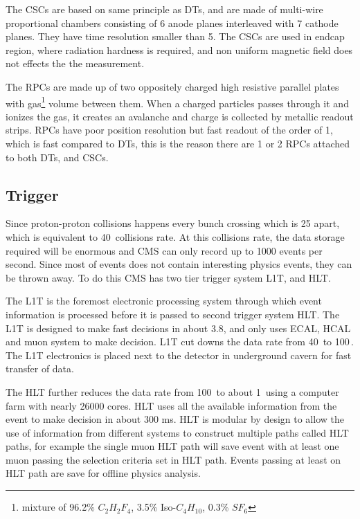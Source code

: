 The \glspl{CSC} are based on same principle as \glspl{DT},
and are made of multi-wire proportional chambers consisting of
6 anode planes interleaved with 7 cathode planes. They have time resolution
smaller than 5\nanoseconds. The \glspl{CSC} are used in endcap region,
where radiation hardness is required, and non uniform magnetic field does not
effects the the measurement.

The \glspl{RPC} are made up of two oppositely charged high resistive parallel
plates with gas\footnote{mixture of 96.2\% \( C_{2}H_{2}F_{4} \), 3.5\% Iso-\( C_{4}H_{10} \),
0.3\% \( S{F}_{6} \)} volume between them.
When a charged particles passes through it and ionizes the gas, it creates
an avalanche and charge is collected by metallic readout strips.
\glspl{RPC} have poor position resolution but fast readout of the order of 1\nanoseconds,
which is fast compared to \glspl{DT}, this is the reason there are 1 or 2 \glspl{RPC}
attached to both \glspl{DT}, and \glspl{CSC}.

\subsection{
  Trigger
}\label{ch_cms:L1T}

Since proton-proton collisions happens every bunch crossing which is
25\nanoseconds{} apart, which is equivalent to 40\,\xspace collisions rate.
At this collisions rate, the data storage required will be enormous
and \gls{CMS} can only record up to 1000 events per second. Since most of events
does not contain interesting physics events, they can be thrown away.
To do this \gls{CMS} has two tier trigger system \gls{L1T}, and \gls{HLT}.

The \gls{L1T} is the foremost electronic processing system through
which event information is processed before it is passed to
second trigger system \gls{HLT}.
The \gls{L1T} is designed to make fast decisions in about 3.8\mus,
and only uses \gls{ECAL}, \gls{HCAL} and muon system to make decision.
\gls{L1T} cut downs the data rate from 40\,\xspace to
100\,\xspace. The \gls{L1T} electronics is placed next to
the detector in underground cavern for fast transfer of data.

The \gls{HLT} further reduces the data rate from 100\,\xspace to
about 1\,\xspace using a computer farm with nearly 26000 cores.
\gls{HLT} uses all the available information from the event to make
decision in about 300 ms. \gls{HLT} is modular by design
to allow the use of information from different systems to construct
multiple paths called \gls{HLT} paths, for example the single muon \gls{HLT}
path will save event with at least one muon passing the selection criteria
set in \gls{HLT} path. Events passing at least on \gls{HLT} path are
save for offline physics analysis.
